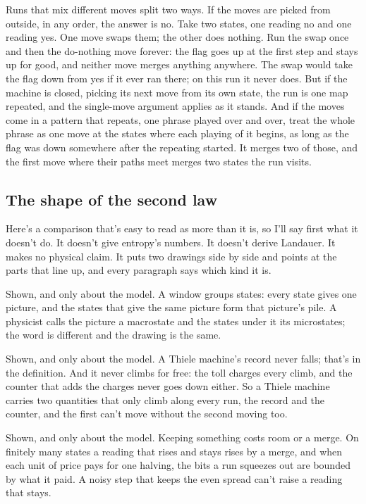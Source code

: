 \documentclass[11pt,twoside]{article}
\theoremstyle{thielethm}
\theoremstyle{thieledef}
\theoremstyle{thieledef}
\theoremstyle{thieledef}
\theoremstyle{thielethm}
\theoremstyle{thieleobs}
\theoremstyle{thielethm}
\begin{document}
Runs that mix different moves split two ways. If the moves are picked from outside, in any order, the answer is no. Take two states, one reading no and one reading yes. One move swaps them; the other does nothing. Run the swap once and then the do-nothing move forever: the flag goes up at the first step and stays up for good, and neither move merges anything anywhere. The swap would take the flag down from yes if it ever ran there; on this run it never does. But if the machine is closed, picking its next move from its own state, the run is one map repeated, and the single-move argument applies as it stands. And if the moves come in a pattern that repeats, one phrase played over and over, treat the whole phrase as one move at the states where each playing of it begins, as long as the flag was down somewhere after the repeating started. It merges two of those, and the first move where their paths meet merges two states the run visits.

\subsection{The shape of the second law}

Here's a comparison that's easy to read as more than it is, so I'll say first what it doesn't do. It doesn't give entropy's numbers. It doesn't derive Landauer. It makes no physical claim. It puts two drawings side by side and points at the parts that line up, and every paragraph says which kind it is.

Shown, and only about the model. A window groups states: every state gives one picture, and the states that give the same picture form that picture's pile. A physicist calls the picture a macrostate and the states under it its microstates; the word is different and the drawing is the same.

Shown, and only about the model. A Thiele machine's record never falls; that's in the definition. And it never climbs for free: the toll charges every climb, and the counter that adds the charges never goes down either. So a Thiele machine carries two quantities that only climb along every run, the record and the counter, and the first can't move without the second moving too.

Shown, and only about the model. Keeping something costs room or a merge. On finitely many states a reading that rises and stays rises by a merge, and when each unit of price pays for one halving, the bits a run squeezes out are bounded by what it paid. A noisy step that keeps the even spread can't raise a reading that stays.
\end{document}
